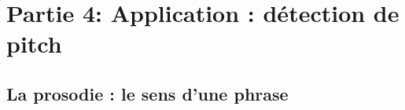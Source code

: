 \newpage
\section{Partie 4: Application : détection de pitch}
\subsection{La prosodie : le sens d’une phrase}

